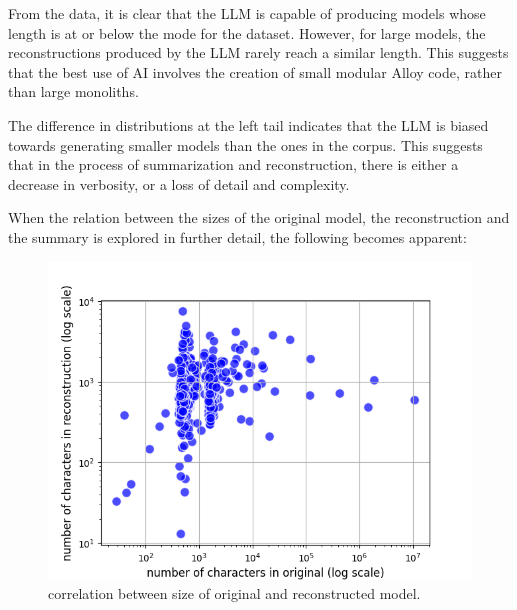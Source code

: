 \documentclass[conference]{IEEEtran}
\begin{document}
    From the data, it is clear that the LLM is capable of producing models whose length is at or below the mode for the dataset. However, for large models, the reconstructions produced by the LLM rarely reach a similar length. This suggests that the best use of AI involves the creation of small modular Alloy code, rather than large monoliths.

    The difference in distributions at the left tail indicates that the LLM is biased towards generating smaller models than the ones in the corpus. This suggests that in the process of summarization and reconstruction, there is either a decrease in verbosity, or a loss of detail and complexity.
    
    When the relation between the sizes of the original model, the reconstruction and the summary is explored in further detail, the following becomes apparent:

    \begin{figure}[htbp]
        \centerline{\includegraphics[width=\linewidth]{"./correlation between size of original and reconstructed model.png"}}
        \caption{correlation between size of original and reconstructed model.}
        \label{fig}
        \end{figure}
        
\end{document}
